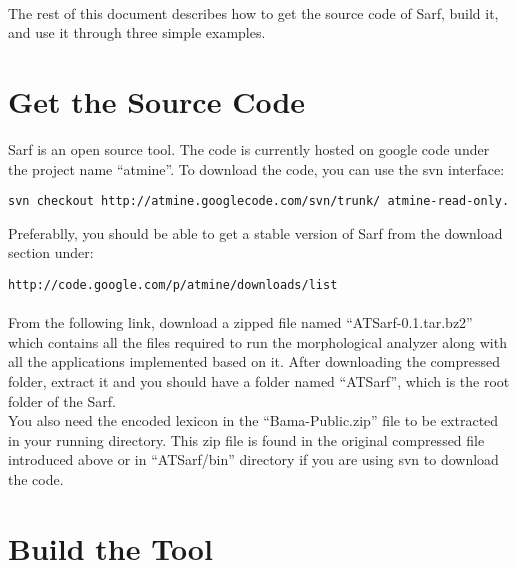 \documentclass{article}
\begin{document}
\paragraph{}
The rest of this document describes how to get the source code of Sarf, build it, and use it through three simple examples.

\section{Get the Source Code}
\label{sec:sourcecode}

Sarf is an open source tool. The code is currently hosted on google code under the project name ``atmine''. To download the code, you can use the svn interface:\\
\begin{verbatim}
svn checkout http://atmine.googlecode.com/svn/trunk/ atmine-read-only.
\end{verbatim}
Preferablly, you should be able to get a stable version of Sarf from the download section under:\\
\begin{verbatim}
http://code.google.com/p/atmine/downloads/list
\end{verbatim}
\paragraph{}
From the following link, download a zipped file named ``ATSarf-0.1.tar.bz2'' which contains all the files required to run the morphological analyzer along with all the applications implemented based on it. After downloading the compressed folder, extract it and you should have a folder named ``ATSarf'', which is the root folder of the Sarf.\\
You also need the encoded lexicon in the ``Bama-Public.zip'' file to be extracted in your running directory. This zip file is found in the original compressed file introduced above or in ``ATSarf/bin'' directory if you are using svn to download the code.

\section{Build the Tool}
\end{document}
